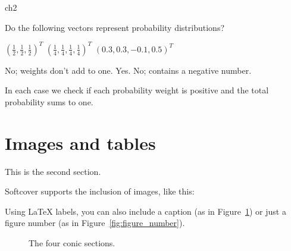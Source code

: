 \begin{exercises}{ch2}

	\begin{exercise} 
		Do the following vectors represent probability distributions?
		\begin{exparts*}
			\partsitem	$\left(\tfrac{1}{2}, \tfrac{1}{2}, \tfrac{1}{2} \right)^T$
			\partsitem	$\left(\tfrac{1}{4}, \tfrac{1}{4}, \tfrac{1}{4}, \tfrac{1}{4} \right)^T$
			\partsitem	$\left(0.3, 0.3, -0.1, 0.5  \right)^T$
		\end{exparts*}

		\begin{eanswer}\begin{ansparts*}
					\partsitem No; weights don't add to one.
					\partsitem Yes.
					\partsitem No; contains a negative number.
					\end{ansparts*}\end{eanswer}

		\begin{esolution}
			In each case we check if each probability weight is positive and
			the total probability sums to one.
		\end{esolution}
	\end{exercise}

\end{exercises}




\section{Images and tables}

This is the second section.

Softcover supports the inclusion of images, like this:


Using \LaTeX{} labels, you can also include a caption (as in Figure~\ref{fig:captioned_image}) or just a figure number (as in Figure~\ref{fig:figure_number}).

\begin{figure}[H]
\begin{center}
\end{center}
\caption{The four conic sections.\label{fig:captioned_image}}

\end{figure}

